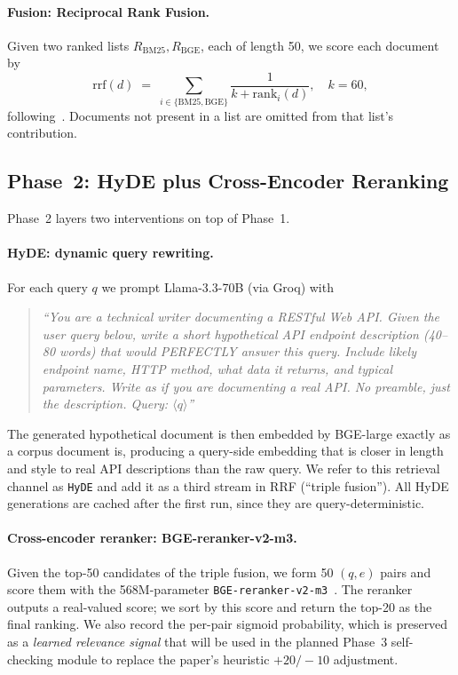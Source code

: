 \documentclass[10pt,a4paper,twocolumn]{article}
\begin{document}
\paragraph{Fusion: Reciprocal Rank Fusion.} Given two ranked lists
\(R_{\mathrm{BM25}}, R_{\mathrm{BGE}}\), each of length 50, we score
each document by
\begin{equation}
  \mathrm{rrf}(d) \;=\; \sum_{i \in \{\mathrm{BM25},\mathrm{BGE}\}}
  \frac{1}{k + \mathrm{rank}_i(d)}, \quad k = 60,
  \label{eq:rrf}
\end{equation}
following~\cite{cormack2009rrf}. Documents not present in a list are
omitted from that list's contribution.

\subsection{Phase~2: HyDE plus Cross-Encoder Reranking}\label{sec:phase2}

Phase~2 layers two interventions on top of Phase~1.

\paragraph{HyDE: dynamic query rewriting.} For each query \(q\) we
prompt Llama-3.3-70B (via Groq) with
\begin{quote}\footnotesize
\textit{``You are a technical writer documenting a RESTful Web API.
Given the user query below, write a short hypothetical API endpoint
description (40--80 words) that would PERFECTLY answer this query.
Include likely endpoint name, HTTP method, what data it returns, and
typical parameters. Write as if you are documenting a real API. No
preamble, just the description. Query: \(\langle q \rangle\)''}
\end{quote}
The generated hypothetical document is then embedded by BGE-large
exactly as a corpus document is, producing a query-side embedding
that is closer in length and style to real API descriptions than the
raw query. We refer to this retrieval channel as \texttt{HyDE} and
add it as a third stream in RRF (``triple fusion''). All HyDE
generations are cached after the first run, since they are
query-deterministic.

\paragraph{Cross-encoder reranker: BGE-reranker-v2-m3.} Given the
top-50 candidates of the triple fusion, we form 50 \((q, e)\) pairs
and score them with the 568M-parameter
\texttt{BGE-reranker-v2-m3}~\cite{xiao2023cpack}. The reranker outputs
a real-valued score; we sort by this score and return the top-20 as
the final ranking. We also record the per-pair sigmoid probability,
which is preserved as a \emph{learned relevance signal} that will be
used in the planned Phase~3 self-checking module to replace the
paper's heuristic $+20/-10$ adjustment.
\end{document}
